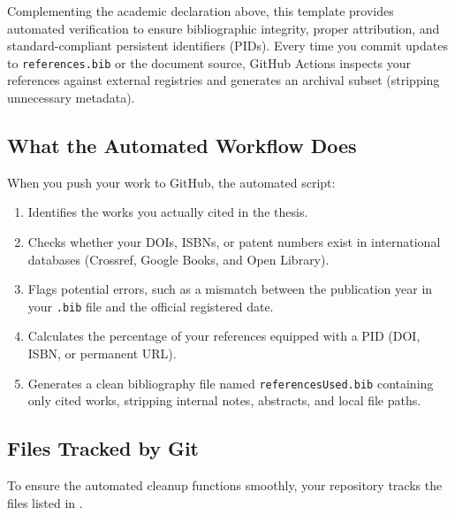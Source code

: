 \documentclass[12pt, twoside]{article}
\newcommand{\fname}[1]{\texttt{#1}}
\begin{document}
Complementing the academic declaration above, this template provides automated verification to ensure bibliographic integrity, proper attribution, and standard-compliant persistent identifiers (\glspl{PID}). Every time you commit updates to \fname{references.bib} or the document source, GitHub Actions inspects your references against external registries and generates an archival subset (stripping unnecessary metadata).

\subsection{What the Automated Workflow Does}
When you push your work to GitHub, the automated script:
\begin{enumerate}
    \item Identifies the works you actually cited in the thesis.
    \item Checks whether your \glspl{DOI}, \glspl{ISBN}, or patent numbers exist in international databases (Crossref, Google Books, and Open Library).
    \item Flags potential errors, such as a mismatch between the publication year in your \fname{.bib} file and the official registered date.
    \item Calculates the percentage of your references equipped with a \gls{PID} (\gls{DOI}, \gls{ISBN}, or permanent \gls{URL}).
    \item Generates a clean bibliography file named \fname{referencesUsed.bib} containing only cited works, stripping internal notes, abstracts, and local file paths.
\end{enumerate}


\subsection{Files Tracked by Git}
To ensure the automated cleanup functions smoothly, your repository tracks the files listed in .
\end{document}
